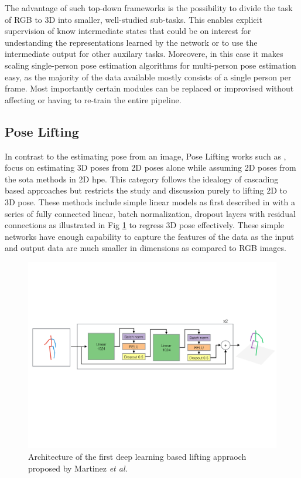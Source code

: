 The advantage of such top-down frameworks is the possibility to divide the task of RGB to 3D into smaller, well-studied sub-tasks. This enables explicit supervision of know intermediate states that could be on interest for undestanding the representations learned by the network or to use the intermediate output for other auxilary tasks. Moreovere, in this case it makes scaling single-person pose estimation algorithms for multi-person pose estimation easy, as the majority of the data available mostly consists of a single person per frame. Most importantly certain modules can be replaced or improvised without affecting or having to re-train the entire pipeline.

\subsection{Pose Lifting}

In contrast to the estimating pose from an image, Pose Lifting works such as \cite{poselifter,  amazon1, repnet, c3dpo, unsupervisedAdversarial}, focus on estimating 3D poses from 2D poses alone while assuming 2D poses from the \ac{sota} methods in 2D \ac{hpe}. This category follows the idealogy of cascading based approaches but restricts the study and discussion purely to lifting 2D to 3D pose. These methods include simple linear models as first described in \cite{MartinezHRL17} with a series of fully connected linear, batch normalization, dropout layers with residual connections  as illustrated in Fig \ref{fig:lifting_arch} to regress 3D pose effectively. These simple networks have enough capability to capture the features of the data as the input and output data are much smaller in dimensions as compared to RGB images.

\begin{figure}[h]
    \centering
    \includegraphics[width=\linewidth]{figures/background/lifting_arch.pdf}
    \caption{Architecture of the first deep learning based lifting appraoch proposed by Martinez \textit{et al.} \cite{MartinezHRL17}}
    \label{fig:lifting_arch}
\end{figure}

